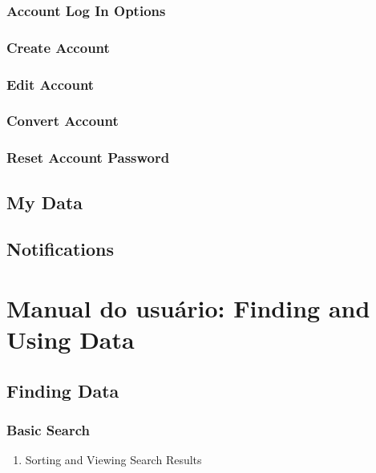 \documentclass[12pt,hidelinks]{article}
\begin{document}
        \subsubsection{Account Log In Options}
        \subsubsection{Create Account}
        \subsubsection{Edit Account}
        \subsubsection{Convert Account}
        \subsubsection{Reset Account Password}
     	
    \subsection{My Data}
     	
    \subsection{Notifications}
     	
\newpage
     	
\section{Manual do usuário: Finding and Using Data}
\vspace{10.5cm}

	\subsection{Finding Data}
	
	    \subsubsection{Basic Search}
	    
	        \begin{enumerate}[a]
	            \item Sorting and Viewing Search Results
	        \end{enumerate}
	        
\end{document}
